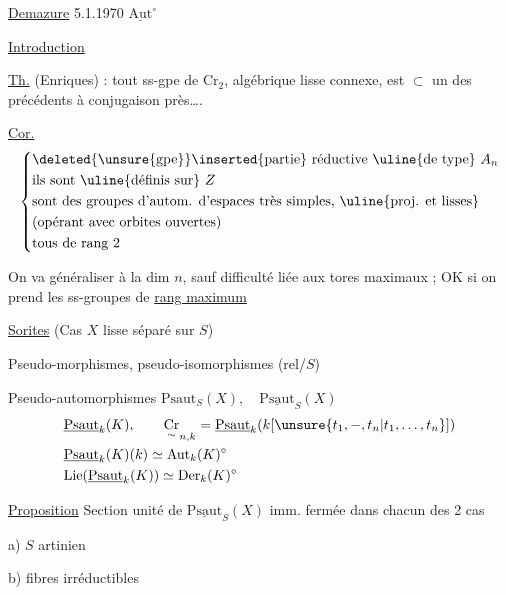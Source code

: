\uline{Demazure} 5.1.1970 \quad $\underline{\mathrm{Aut}}^{\circ}$

\uline{Introduction}

\uline{Th.} (Enriques) : tout ss-gpe de $\mathrm{Cr}_2$, algébrique lisse connexe, est $\subset$ un des précédents à conjugaison près\ldots.

\uline{Cor.}
\[
\left\{\begin{aligned}
&\text{\deleted{\unsure{gpe}}\inserted{partie}}\ \text{réductive \uline{de type} }A_n\\
&\text{ils sont \uline{définis sur} }Z\\
&\text{sont des groupes d'autom. d'espaces très simples, \uline{proj. et lisses}}\\
&\text{(opérant avec orbites ouvertes)}\\
&\text{tous de rang }2
\end{aligned}\right.
\]

On va généraliser à la dim $n$, sauf difficulté liée aux tores maximaux ; OK si on prend les ss-groupes de \uline{rang maximum}

\uline{Sorites} \quad (Cas $X$ lisse séparé  sur $S$)

Pseudo-morphismes, pseudo-isomorphismes (rel/$S$)

Pseudo-automorphismes \(\mathrm{Psaut}_S(X),\quad\underline{\mathrm{Psaut}}_S(X)\)
\[
\begin{aligned}
&\underline{\mathrm{Psaut}}_k(K),\qquad
\underset{\sim}{\mathrm{Cr}}_{n,k}=\underline{\mathrm{Psaut}}_k(k[\unsure{t_1,-,t_n|t_1,\ldots,t_n}])\\
&\underline{\mathrm{Psaut}}_k(K)(k)\simeq\mathrm{Aut}_k(K)^{\circ}\\
&\mathrm{Lie}(\underline{\mathrm{Psaut}}_k(K))\simeq\mathrm{Der}_k(K)^{\circ}
\end{aligned}
\]

\uline{Proposition} Section unité de $\underline{\mathrm{Psaut}}_S(X)$ imm. fermée dans chacun des 2 cas

a) $S$ artinien

b) fibres  irréductibles

